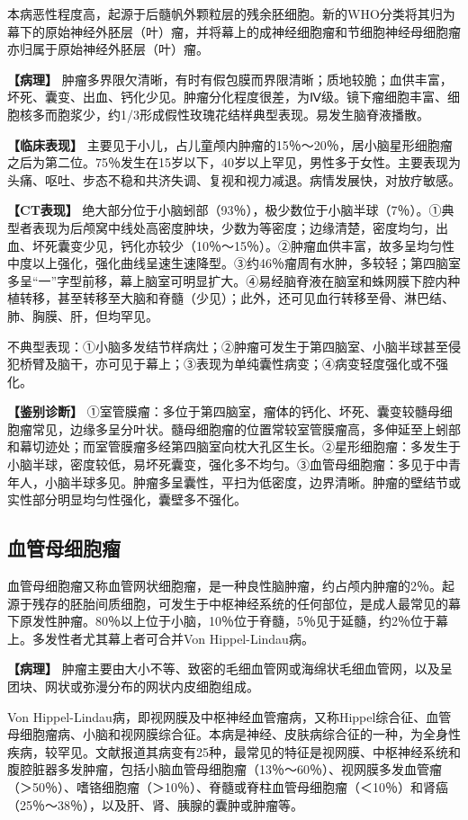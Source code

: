 本病恶性程度高，起源于后髓帆外颗粒层的残余胚细胞。新的WHO分类将其归为幕下的原始神经外胚层（叶）瘤，并将幕上的成神经细胞瘤和节细胞神经母细胞瘤亦归属于原始神经外胚层（叶）瘤。

\textbf{【病理】}
肿瘤多界限欠清晰，有时有假包膜而界限清晰；质地较脆；血供丰富，坏死、囊变、出血、钙化少见。肿瘤分化程度很差，为Ⅳ级。镜下瘤细胞丰富、细胞核多而胞浆少，约1/3形成假性玫瑰花结样典型表现。易发生脑脊液播散。

\textbf{【临床表现】}
主要见于小儿，占儿童颅内肿瘤的15％～20％，居小脑星形细胞瘤之后为第二位。75％发生在15岁以下，40岁以上罕见，男性多于女性。主要表现为头痛、呕吐、步态不稳和共济失调、复视和视力减退。病情发展快，对放疗敏感。

\textbf{【CT表现】}
绝大部分位于小脑蚓部（93％），极少数位于小脑半球（7％）。①典型者表现为后颅窝中线处高密度肿块，少数为等密度；边缘清楚，密度均匀，出血、坏死囊变少见，钙化亦较少（10％～15％）。②肿瘤血供丰富，故多呈均匀性中度以上强化，强化曲线呈速生速降型。③约46％瘤周有水肿，多较轻；第四脑室多呈“一”字型前移，幕上脑室可明显扩大。④易经脑脊液在脑室和蛛网膜下腔内种植转移，甚至转移至大脑和脊髓（少见）；此外，还可见血行转移至骨、淋巴结、肺、胸膜、肝，但均罕见。

不典型表现：①小脑多发结节样病灶；②肿瘤可发生于第四脑室、小脑半球甚至侵犯桥臂及脑干，亦可见于幕上；③表现为单纯囊性病变；④病变轻度强化或不强化。

\textbf{【鉴别诊断】}
①室管膜瘤：多位于第四脑室，瘤体的钙化、坏死、囊变较髓母细胞瘤常见，边缘多呈分叶状。髓母细胞瘤的位置常较室管膜瘤高，多伸延至上蚓部和幕切迹处；而室管膜瘤多经第四脑室向枕大孔区生长。②星形细胞瘤：多发生于小脑半球，密度较低，易坏死囊变，强化多不均匀。③血管母细胞瘤：多见于中青年人，小脑半球多见。肿瘤多呈囊性，平扫为低密度，边界清晰。肿瘤的壁结节或实性部分明显均匀性强化，囊壁多不强化。

\subsection{血管母细胞瘤}

血管母细胞瘤又称血管网状细胞瘤，是一种良性脑肿瘤，约占颅内肿瘤的2％。起源于残存的胚胎间质细胞，可发生于中枢神经系统的任何部位，是成人最常见的幕下原发性肿瘤。80％以上位于小脑，10％位于脊髓，5％见于延髓，约2％位于幕上。多发性者尤其幕上者可合并Von
Hippel-Lindau病。

\textbf{【病理】}
肿瘤主要由大小不等、致密的毛细血管网或海绵状毛细血管网，以及呈团块、网状或弥漫分布的网状内皮细胞组成。

Von
Hippel-Lindau病，即视网膜及中枢神经血管瘤病，又称Hippel综合征、血管母细胞瘤病、小脑和视网膜综合征。本病是神经、皮肤病综合征的一种，为全身性疾病，较罕见。文献报道其病变有25种，最常见的特征是视网膜、中枢神经系统和腹腔脏器多发肿瘤，包括小脑血管母细胞瘤（13％～60％）、视网膜多发血管瘤（＞50％）、嗜铬细胞瘤（＞10％）、脊髓或脊柱血管母细胞瘤（＜10％）和肾癌（25％～38％），以及肝、肾、胰腺的囊肿或肿瘤等。

